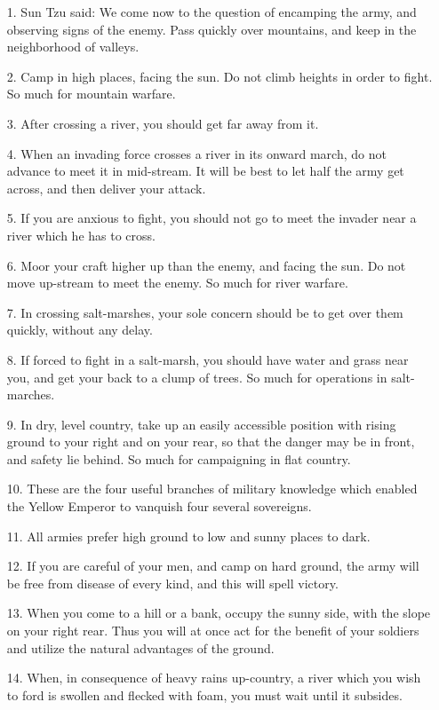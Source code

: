 \documentclass[11pt,openany]{memoir}
\newcommand{\enumeratemargin}{1.30em}
\begin{document}
\begin{enumerate}[leftmargin=\enumeratemargin]
\item[1.] Sun Tzu said: We come now to the question of encamping the army, and observing signs of the enemy. Pass quickly over mountains, and keep in the neighborhood of valleys.
\item[2.] Camp in high places, facing the sun. Do not climb heights in order to fight. So much for mountain warfare.
\item[3.] After crossing a river, you should get far away from it.
\item[4.] When an invading force crosses a river in its onward march, do not advance to meet it in mid-stream. It will be best to let half the army get across, and then deliver your attack.
\item[5.] If you are anxious to fight, you should not go to meet the invader near a river which he has to cross.
\item[6.] Moor your craft higher up than the enemy, and facing the sun. Do not move up-stream to meet the enemy. So much for river warfare.
\item[7.] In crossing salt-marshes, your sole concern should be to get over them quickly, without any delay.
\item[8.] If forced to fight in a salt-marsh, you should have water and grass near you, and get your back to a clump of trees. So much for operations in salt-marches.
\item[9.] In dry, level country, take up an easily accessible position with rising ground to your right and on your rear, so that the danger may be in front, and safety lie behind. So much for campaigning in flat country.
\item[10.] These are the four useful branches of military knowledge which enabled the Yellow Emperor to vanquish four several sovereigns.
\item[11.] All armies prefer high ground to low and sunny places to dark.
\item[12.] If you are careful of your men, and camp on hard ground, the army will be free from disease of every kind, and this will spell victory.
\item[13.] When you come to a hill or a bank, occupy the sunny side, with the slope on your right rear. Thus you will at once act for the benefit of your soldiers and utilize the natural advantages of the ground.
\item[14.] When, in consequence of heavy rains up-country, a river which you wish to ford is swollen and flecked with foam, you must wait until it subsides.

\end{enumerate}
\end{document}

